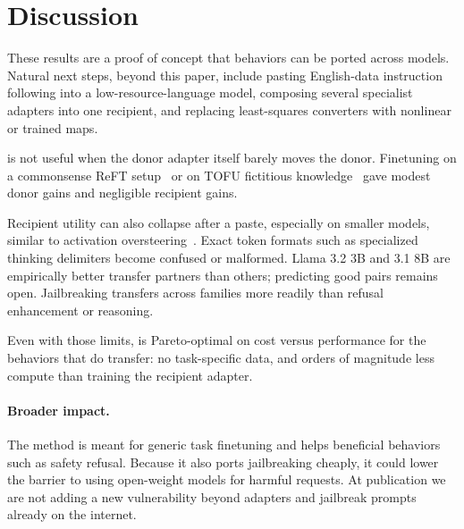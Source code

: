 
\section{Discussion}
\label{sec-discussion}
These results are a proof of concept that behaviors can be ported across models.
Natural next steps, beyond this paper, include pasting English-data instruction following into a low-resource-language model, composing several specialist adapters into one recipient, and replacing least-squares converters with nonlinear or trained maps.

\cmdv{} is not useful when the donor adapter itself barely moves the donor.
Finetuning on a commonsense ReFT setup~\cite{hu2023adapters,wu2024reft} or on TOFU fictitious knowledge~\cite{maini2024} gave modest donor gains and negligible recipient gains.


Recipient utility can also collapse after a paste, especially on smaller models, similar to activation oversteering~\cite{konen2024}.
Exact token formats such as specialized thinking delimiters become confused or malformed.
Llama 3.2 3B and 3.1 8B are empirically better transfer partners than others; predicting good pairs remains open.
Jailbreaking transfers across families more readily than refusal enhancement or reasoning.

Even with those limits, \cmdv{} is Pareto-optimal on cost versus performance for the behaviors that do transfer: no task-specific data, and orders of magnitude less compute than training the recipient adapter.

\paragraph{Broader impact.}
The method is meant for generic task finetuning and helps beneficial behaviors such as safety refusal.
Because it also ports jailbreaking cheaply, it could lower the barrier to using open-weight models for harmful requests.
At publication we are not adding a new vulnerability beyond adapters and jailbreak prompts already on the internet.

